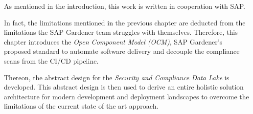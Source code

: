 As mentioned in the introduction, this work is written in cooperation with SAP.\par
In fact, the limitations mentioned in the previous chapter are deducted from the limitations the SAP Gardener team struggles with themselves. Therefore, this chapter introduces the \textit{Open Component Model (OCM)}, SAP Gardener's proposed standard to automate software delivery and decouple the compliance scans from the CI/CD pipeline.\par
Thereon, the abstract design for the \emph{Security and Compliance Data Lake} is developed. This abstract design is then used to derive an entire holistic solution architecture for modern development and deployment landscapes to overcome the limitations of the current state of the art approach.

